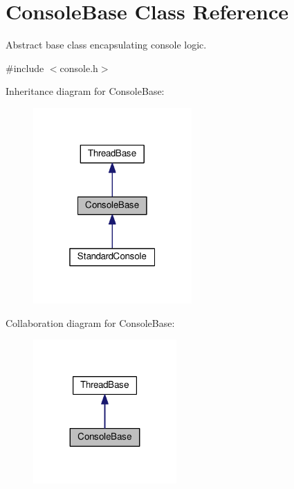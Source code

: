 \hypertarget{classConsoleBase}{}\section{Console\+Base Class Reference}
\label{classConsoleBase}


Abstract base class encapsulating console logic.  




{\ttfamily \#include $<$console.\+h$>$}



Inheritance diagram for Console\+Base\+:\nopagebreak
\begin{figure}[H]
\begin{center}
\leavevmode
\includegraphics[width=172pt]{classConsoleBase__inherit__graph}
\end{center}
\end{figure}


Collaboration diagram for Console\+Base\+:\nopagebreak
\begin{figure}[H]
\begin{center}
\leavevmode
\includegraphics[width=155pt]{classConsoleBase__coll__graph}
\end{center}
\end{figure}
